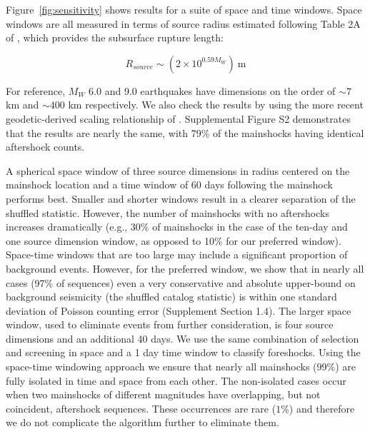 \documentclass[draft, jgrga]{agujournal2018}
\begin{document}
Figure~\ref{fig:sensitivity} shows results for a suite of space and time windows. Space windows are all measured in terms of source radius estimated following Table 2A of \citet{Wells1994}, which provides the subsurface rupture length:
%
\begin{linenomath*}
\begin{equation}\label{eq:wells}
    R_{source}\sim (2\times 10^{0.59M_W})\SI{}{\meter}
\end{equation}
\end{linenomath*}
%
For reference, $M_W$ 6.0 and 9.0 earthquakes have dimensions on the order of $\sim 7$ km and $\sim 400$ km respectively. We also check the results by using the more recent geodetic-derived scaling relationship of \citet{Brengman2019EarthquakeScalingDistributions}. Supplemental Figure S2 demonstrates that the results are nearly the same, with 79\% of the mainshocks having identical aftershock counts.

A spherical space window of three source dimensions in radius centered on the mainshock location and a time window of 60 days following the mainshock performs best. Smaller and shorter windows result in a clearer separation of the shuffled statistic. However, the number of mainshocks with no aftershocks increases dramatically (e.g., 30\% of mainshocks in the case of the ten-day and one source dimension window, as opposed to 10\% for our preferred window). Space-time windows that are too large may include a significant proportion of background events. However, for the preferred window, we show that in nearly all cases (97\% of sequences) even a very conservative and absolute upper-bound on background seismicity (the shuffled catalog statistic) is within one standard deviation of Poisson counting error (Supplement Section 1.4). The larger space window, used to eliminate events from further consideration, is four source dimensions and an additional 40 days. We use the same combination of selection and screening in space and a 1 day time window to classify foreshocks. Using the space-time windowing approach we ensure that nearly all mainshocks (99\%) are fully isolated in time and space from each other. The non-isolated cases occur when two mainshocks of different magnitudes have overlapping, but not coincident, aftershock sequences. These occurrences are rare ($1\%$) and therefore we do not complicate the algorithm further to eliminate them.
\end{document}
